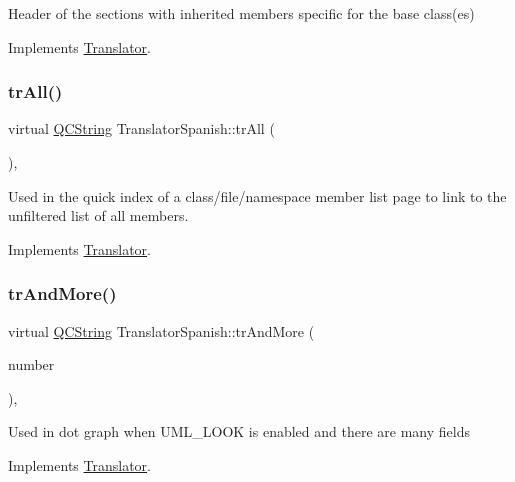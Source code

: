 Header of the sections with inherited members specific for the base class(es) 

Implements \mbox{\hyperlink{class_translator}{Translator}}.

\mbox{\label{class_translator_spanish_a757a95853449c5aa5f7207c02275ab0e}} 
\subsubsection{\texorpdfstring{trAll()}{trAll()}}
{\footnotesize\ttfamily virtual \mbox{\hyperlink{class_q_c_string}{Q\+C\+String}} Translator\+Spanish\+::tr\+All (\begin{DoxyParamCaption}{ }\end{DoxyParamCaption})\hspace{0.3cm}{\ttfamily [inline]}, {\ttfamily [virtual]}}

Used in the quick index of a class/file/namespace member list page to link to the unfiltered list of all members. 

Implements \mbox{\hyperlink{class_translator}{Translator}}.

\mbox{\label{class_translator_spanish_aec5f1ae3a5066f22ce8c00f9783959c1}} 
\subsubsection{\texorpdfstring{trAndMore()}{trAndMore()}}
{\footnotesize\ttfamily virtual \mbox{\hyperlink{class_q_c_string}{Q\+C\+String}} Translator\+Spanish\+::tr\+And\+More (\begin{DoxyParamCaption}\item[{const \mbox{\hyperlink{class_q_c_string}{Q\+C\+String}} \&}]{number }\end{DoxyParamCaption})\hspace{0.3cm}{\ttfamily [inline]}, {\ttfamily [virtual]}}

Used in dot graph when U\+M\+L\+\_\+\+L\+O\+OK is enabled and there are many fields 

Implements \mbox{\hyperlink{class_translator}{Translator}}.

\mbox{\label{class_translator_spanish_aebd68d990bde5e8984d4b4ace14aa0d9}} 
